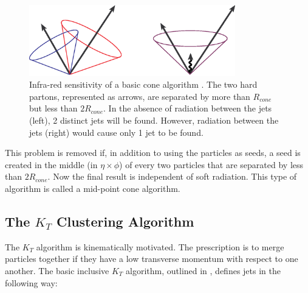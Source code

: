 \begin{figure}[t]
\centering
	\includegraphics[width=0.8\textwidth]{Diagrams/cone-fig1.eps}
\caption[Infra-red sensitivity of a basic cone algorithm]{Infra-red sensitivity of a basic cone algorithm \cite{Blazey:2000qt}. The two hard partons, represented as arrows, are separated by more than $R_{cone}$ but less than $2R_{cone}$. In the absence of radiation between the jets (left), 2 distinct jets will be found. However, radiation between the jets (right) would cause only 1 jet to be found. \label{infraredcone}}
\end{figure}

This problem is removed if, in addition to using the particles as seeds, a seed is created in the middle (in $\eta \times \phi$) of every two particles that are separated by less than $2R_{cone}$. Now the final result is independent of soft radiation. This type of algorithm is called a mid-point cone algorithm.

\subsection{The $K_T$ Clustering Algorithm}

The $K_T$ algorithm is kinematically motivated. The prescription is to merge particles together if they have a low transverse momentum with respect to one another. The basic inclusive $K_T$ algorithm, outlined in \cite{Butterworth:2002xg}, defines jets in the following way:

